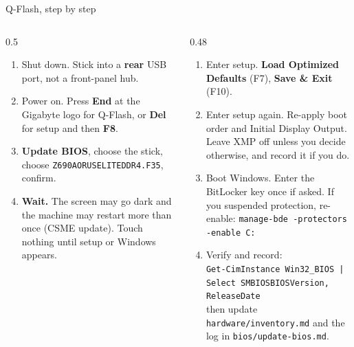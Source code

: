 \documentclass[aspectratio=169,11pt]{beamer}
\begin{document}
\begin{frame}{Q-Flash, step by step}
  \begin{columns}[T,onlytextwidth]
    \begin{column}{0.5\textwidth}
      \scriptsize
      \begin{enumerate}\setlength{\itemsep}{0.2em}
        \item Shut down. Stick into a \textbf{rear} USB port, not a front-panel hub.
        \item Power on. Press \textbf{End} at the Gigabyte logo for Q-Flash, or \textbf{Del} for
          setup and then \textbf{F8}.
        \item \textbf{Update BIOS}, choose the stick, choose \texttt{Z690AORUSELITEDDR4.F35}, confirm.
        \item \textbf{Wait.} The screen may go dark and the machine may restart more than once
          (CSME update). Touch nothing until setup or Windows appears.
      \end{enumerate}
    \end{column}
    \begin{column}{0.48\textwidth}
      \scriptsize
      \begin{enumerate}\setlength{\itemsep}{0.2em}\setcounter{enumi}{4}
        \item Enter setup. \textbf{Load Optimized Defaults} (F7), \textbf{Save \& Exit} (F10).
        \item Enter setup again. Re-apply boot order and Initial Display Output. Leave XMP off
          unless you decide otherwise, and record it if you do.
        \item Boot Windows. Enter the BitLocker key once if asked. If you suspended protection,
          re-enable: \texttt{manage-bde -protectors -enable C:}
        \item Verify and record:\\
          \texttt{Get-CimInstance Win32\_BIOS | Select SMBIOSBIOSVersion, ReleaseDate}\\
          then update \texttt{hardware/inventory.md} and the log in \texttt{bios/update-bios.md}.
      \end{enumerate}
    \end{column}
  \end{columns}
\end{frame}
\end{document}
